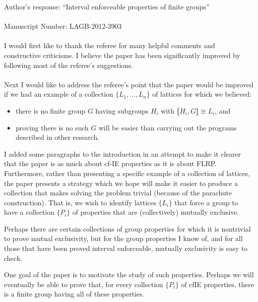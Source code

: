 \documentclass{article}
\newcommand{\lb}{\ensuremath{\llbracket}}
\newcommand{\rb}{\ensuremath{\rrbracket}}
\begin{document}
\noindent Author's response: ``Interval enforceable properties of finite groups''\\
\\
Manuscript Number: LAGB-2012-3903\\
\\
I would first like to thank the referee for many helpful comments and constructive
criticisms.  I believe the paper has been significantly improved by following
most of the referee's suggestions.\\
\\
Next I would like to address the referee's point that the paper would be
improved if we had an example of a collection $\{L_1, \dots, L_n\}$ of
lattices for which we believed:
\begin{itemize}
\item 
 there is no finite group $G$ having subgroups $H_i$ with $\lb H_i, G\rb
\cong L_i$, and 
\item proving there is no such $G$ will be easier than carrying out the programs
  described in other research.
\end{itemize}
I added some paragraphs to the introduction in an attempt to make it clearer 
that the paper is as much about cf-IE properties as it is about FLRP. 
Furthermore, rather than presenting a specific example of a collection of
lattices, the paper presents a strategy which we hope will make it easier to
produce a collection that makes solving the problem trivial (because of the
parachute construction).  That is, we wish to identify lattices $\{L_i\}$ that force a
group to have a collection $\{P_i\}$ of properties that are (collectively)
mutually exclusive.   

Perhaps there are certain collections of group properties for which it is
nontrivial to prove mutual exclusivity, but for the group properties I know of,
and for all those that have been proved interval enforceable, mutually
exclusivity is easy to check. 

One goal of the paper is to motivate the study of such properties.  Perhaps we
will eventually be able to prove that, for every collection $\{P_i\}$ of
\acs{cfIE} properties, there is a finite group having all of these properties.
\end{document}
